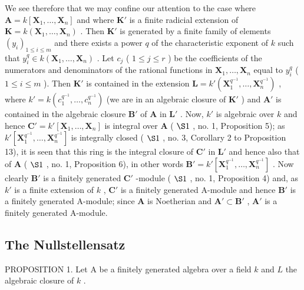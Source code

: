 We see therefore that we may confine our attention to the case where \(\mathbf{A} = k[\mathbf{X}_1, \ldots, \mathbf{X}_n]\) and where \(\mathbf{K}'\) is a finite radicial extension of \(\mathbf{K} = k(\mathbf{X}_1, \ldots, \mathbf{X}_n)\) . Then \(\mathbf{K}'\) is generated by a finite family of elements \((y_i)_{1 \leqslant i \leqslant m}\) and there exists a power \(q\) of the characteristic exponent of \(k\) such that \(y_i^q \in k(\mathbf{X}_1, \ldots, \mathbf{X}_n)\) . Let \(c_j\) ( \(1 \leqslant j \leqslant r\) ) be the coefficients of the numerators and denominators of the rational functions in \(\mathbf{X}_1, \ldots, \mathbf{X}_n\) equal to \(y_i^q\) ( \(1 \leqslant i \leqslant m\) ). Then \(\mathbf{K}'\) is contained in the extension \(\mathbf{L} = k'(\mathbf{X}_1^{q^{-1}}, \ldots, \mathbf{X}_n^{q^{-1}})\) , where \(k' = k(c_1^{q^{-1}}, \ldots, c_n^{q^{-1}})\) (we are in an algebraic closure of \(\mathbf{K}'\) ) and \(\mathbf{A}'\) is contained in the algebraic closure \(\mathbf{B}'\) of \(\mathbf{A}\) in \(\mathbf{L}'\) . Now, \(k'\) is algebraic over \(k\) and hence \(\mathbf{C}' = k'[\mathbf{X}_1, \ldots, \mathbf{X}_n]\) is integral over \(\mathbf{A}\) ( \(\S 1\) , no. 1, Proposition 5); as \(k'[\mathbf{X}_1^{q^{-1}}, \ldots, \mathbf{X}_n^{q^{-1}}]\) is integrally closed ( \(\S 1\) , no. 3, Corollary 2 to Proposition 13), it is seen that this ring is the integral closure of \(\mathbf{C}'\) in \(\mathbf{L}'\) and hence also that of \(\mathbf{A}\) ( \(\S 1\) , no. 1, Proposition 6), in other words \(\mathbf{B}' = k'[\mathbf{X}_1^{q^{-1}}, \ldots, \mathbf{X}_n^{q^{-1}}]\) . Now clearly \(\mathbf{B}'\) is a finitely generated \(\mathbf{C}'\) -module ( \(\S 1\) , no. 1, Proposition 4) and, as \(k'\) is a finite extension of \(k\) , \(\mathbf{C}'\) is a finitely generated A-module and hence \(\mathbf{B}'\) is a finitely generated A-module; since \(\mathbf{A}\) is Noetherian and \(\mathbf{A}' \subset \mathbf{B}'\) , \(\mathbf{A}'\) is a finitely generated A-module.

\subsection{The Nullstellensatz}

PROPOSITION 1. Let A be a finitely generated algebra over a field \(k\) and \(L\) the algebraic closure of \(k\) .

